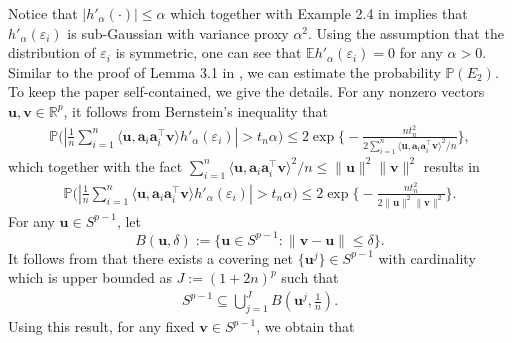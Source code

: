 \documentclass{article}
\numberwithin{equation}{section}
\begin{document}
 Notice that $|h'_\alpha(\cdot)|\leq\alpha$ which together with Example 2.4 in \cite{wainwright2019high} implies that  $h'_{\alpha}(\varepsilon_i)$ is sub-Gaussian with variance proxy $\alpha^2$. Using the assumption that the distribution of $\varepsilon_i$ is symmetric, one can see that $\mathbb{E}h'_{\alpha}(\varepsilon_i)=0$ for any $\alpha>0$.  Similar to the proof of Lemma 3.1 in \cite{fan2022oracle}, we can estimate the probability $\mathbb{P}(E_2)$.  To keep the paper self-contained, we give the details.
For any nonzero vectors $\mathbf{u}, \mathbf{v}\in\mathbb{R}^p$, it follows from Bernstein's inequality   that
\begin{equation}
	\begin{aligned}
		\mathbb{P}\Big(|\frac{1}{n}\sum_{i=1}^n\langle \mathbf{u}, \mathbf{a}_i\mathbf{a}_i^\top\mathbf{v}\rangle h'_{\alpha}(\varepsilon_i)|>t_n\alpha\Big)\leq
		2\exp\Big\lbrace -\frac{nt_n^2}{2\sum_{i=1}^n  \langle \mathbf{u}, \mathbf{a}_i\mathbf{a}_i^\top\mathbf{v}\rangle^2/n}\Big\rbrace,\nonumber
	\end{aligned}
\end{equation}
which together with the fact $\sum_{i=1}^n \langle \mathbf{u}, \mathbf{a}_i\mathbf{a}_i^\top\mathbf{v}\rangle^2/n\leq \|\mathbf{u}\|^2\|\mathbf{v}\|^2$ results in
\begin{equation}\label{uav-error}
	\begin{aligned}
		\mathbb{P}\Big(|\frac{1}{n}\sum_{i=1}^n \langle \mathbf{u}, \mathbf{a}_i\mathbf{a}_i^\top\mathbf{v}\rangle h'_{\alpha}(\varepsilon_i)|>t_n\alpha\Big)\leq
		2\exp\Big\lbrace -\frac{nt_n^2}{2\|\mathbf{u}\|^2\|\mathbf{v}\|^2}\Big\rbrace.
	\end{aligned}
\end{equation}
For any $\mathbf{u}\in S^{p-1}$, let $$ B(\mathbf{u},\delta):=\{\mathbf{u}\in S^{p-1}:\|\mathbf{v}-\mathbf{u}\|\leq{}\delta\}.$$
It follows from \cite[Example 5.8]{wainwright2019high} that there exists a covering net $\{\mathbf{u}^j\}\in S^{p-1}$ with cardinality which is upper bounded as $J:=(1+2n)^p$ such that   
\begin{equation}\nonumber
	\begin{aligned}
		S^{p-1}\subseteq\bigcup_{j=1}^{J}B\left( \mathbf{u}^j,\frac{1}{n}\right).
	\end{aligned}
\end{equation}
Using this result,  for any fixed $\mathbf{v}\in S^{p-1}$, we obtain that
\end{document}
